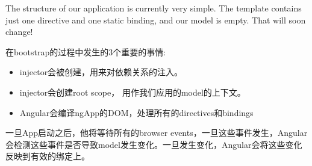 The structure of our application is currently very simple. The template contains just one directive and one static binding, and our model is empty. That will soon change!


在bootstrap的过程中发生的3个重要的事情:
\begin{itemize}
\item injector会被创建，用来对依赖关系的注入。
\item injector会创建root scope， 用作我们应用的model的上下文。
\item Angular会编译ngApp的DOM，处理所有的directives和bindings
\end{itemize}

一旦App启动之后，他将等待所有的browser events，一旦这些事件发生，Angular会检测这些事件是否导致model发生变化。一旦发生变化，Angular会将这些变化反映到有效的绑定上。



